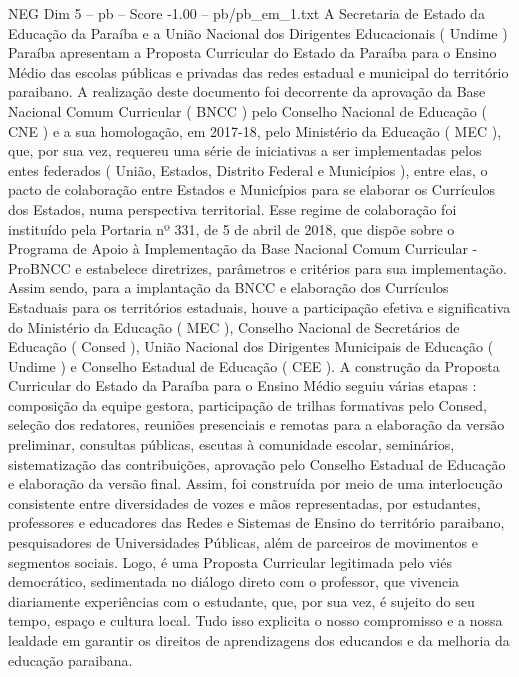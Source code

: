 \begin{textsample}{NEG Dim 5 – pb – Score -1.00 – pb/pb\_em\_1.txt}  \label{ex:f5_neg_192}
A Secretaria de Estado da Educação da Paraíba e a União Nacional dos Dirigentes Educacionais ( Undime ) Paraíba apresentam a Proposta Curricular do Estado da Paraíba para o Ensino Médio das escolas públicas e privadas das redes estadual e municipal do território paraibano.
A realização deste documento foi decorrente da aprovação da Base Nacional Comum Curricular ( BNCC ) pelo Conselho Nacional de Educação ( CNE ) e a sua homologação, em 2017-18, pelo Ministério da Educação ( MEC ), que, por sua vez, requereu uma série de iniciativas a ser implementadas pelos entes federados ( União, Estados, Distrito Federal e Municípios ), entre elas, o pacto de colaboração entre Estados e Municípios para se elaborar os Currículos dos Estados, numa perspectiva territorial.
Esse regime de colaboração foi instituído pela Portaria nº 331, de 5 de abril de 2018, que dispõe sobre o Programa de Apoio à Implementação da Base Nacional Comum Curricular - ProBNCC e estabelece diretrizes, parâmetros e critérios para sua implementação.
Assim sendo, para a implantação da BNCC e elaboração dos Currículos Estaduais para os territórios estaduais, houve a participação efetiva e significativa do Ministério da Educação ( MEC ), Conselho Nacional de Secretários de Educação ( Consed ), União Nacional dos Dirigentes Municipais de Educação ( Undime ) e Conselho Estadual de Educação ( CEE ).
A construção da Proposta Curricular do Estado da Paraíba para o Ensino Médio seguiu várias etapas : composição da equipe gestora, participação de trilhas formativas pelo Consed, seleção dos redatores, reuniões presenciais e remotas para a elaboração da versão preliminar, consultas públicas, escutas à comunidade escolar, seminários, sistematização das contribuições, aprovação pelo Conselho Estadual de Educação e elaboração da versão final.
Assim, foi construída por meio de uma interlocução consistente entre diversidades de vozes e mãos representadas, por estudantes, professores e educadores das Redes e Sistemas de Ensino do território paraibano, pesquisadores de Universidades Públicas, além de parceiros de movimentos e segmentos sociais.
Logo, é uma Proposta Curricular legitimada pelo viés democrático, sedimentada no diálogo direto com o professor, que vivencia diariamente experiências com o estudante, que, por sua vez, é sujeito do seu tempo, espaço e cultura local.
Tudo isso explicita o nosso compromisso e a nossa lealdade em garantir os direitos de aprendizagens dos educandos e da melhoria da educação paraibana.

\end{textsample}
